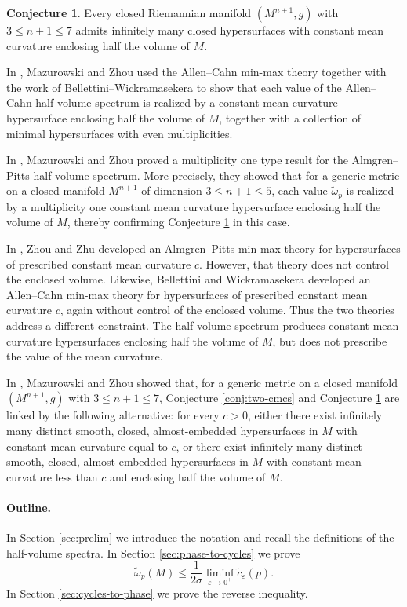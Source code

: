 \documentclass[12pt,english]{article}
\theoremstyle{definition}
\newtheorem{conjecture}[theorem]{Conjecture}
\begin{document}
\begin{conjecture}
\label{conj:CMC-Yau}
Every closed Riemannian manifold $(M^{n+1},g)$ with $3\le n+1\le 7$ admits infinitely many closed hypersurfaces with constant mean curvature enclosing half the volume of $M$.
\end{conjecture}

In \cite{ZhouMazur0}, Mazurowski and Zhou used the Allen--Cahn min-max theory together with the work of Bellettini--Wickramasekera \cite{bellettini2020inhomogeneous} to show that each value of the Allen--Cahn half-volume spectrum is realized by a constant mean curvature hypersurface enclosing half the volume of $M$, together with a collection of minimal hypersurfaces with even multiplicities.

In \cite{ZhouMazur1}, Mazurowski and Zhou proved a multiplicity one type result for the Almgren--Pitts half-volume spectrum. More precisely, they showed that for a generic metric on a closed manifold $M^{n+1}$ of dimension $3\le n+1\le 5$, each value $\tilde\omega_p$ is realized by a multiplicity one constant mean curvature hypersurface enclosing half the volume of $M$, thereby confirming Conjecture \ref{conj:CMC-Yau} in this case.

In \cite{ZZ}, Zhou and Zhu developed an Almgren--Pitts min-max theory for hypersurfaces of prescribed constant mean curvature $c$. However, that theory does not control the enclosed volume. Likewise, Bellettini and Wickramasekera \cite{bellettini2020inhomogeneous} developed an Allen--Cahn min-max theory for hypersurfaces of prescribed constant mean curvature $c$, again without control of the enclosed volume. Thus the two theories address a different constraint. The half-volume spectrum produces constant mean curvature hypersurfaces enclosing half the volume of $M$, but does not prescribe the value of the mean curvature.

In \cite{ZhouMazur2}, Mazurowski and Zhou showed that, for a generic metric on a closed manifold $(M^{n+1},g)$ with $3\le n+1\le 7$, Conjecture \ref{conj:two-cmcs} and Conjecture \ref{conj:CMC-Yau} are linked by the following alternative: for every $c>0$, either there exist infinitely many distinct smooth, closed, almost-embedded hypersurfaces in $M$ with constant mean curvature equal to $c$, or there exist infinitely many distinct smooth, closed, almost-embedded hypersurfaces in $M$ with constant mean curvature less than $c$ and enclosing half the volume of $M$.

\paragraph*{Outline.} In Section \ref{sec:prelim} we introduce the notation and recall the definitions of the half-volume spectra. In Section \ref{sec:phase-to-cycles} we prove
\[
\tilde\omega_p(M)\le \frac{1}{2\sigma}\liminf_{\varepsilon\to 0^+}\tilde c_\varepsilon(p).
\]
In Section \ref{sec:cycles-to-phase} we prove the reverse inequality.
\end{document}
